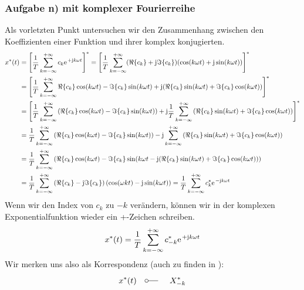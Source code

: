 \documentclass[11pt,a4paper,DIV=12]{scrartcl}
\begin{document}
\subsubsection{Aufgabe n) mit komplexer Fourierreihe}
%
Als vorletzten Punkt untersuchen wir den Zusammenhang zwischen den Koeffizienten
einer Funktion und ihrer komplex konjugierten.
%
%
\begin{align}
	x^*(t)&=\left [\frac{1}{T}\sum_{k=-\infty}^{+\infty}c_k\e^{+\im k \omega t}\right ]^*=\left [\frac{1}{T}\sum_{k=-\infty}^{+\infty}(\Re\{c_k\}+\im\Im\{c_k\})(\cos(k\omega t)+\im\sin(k\omega t))\right ]^*\nonumber \\
	&=\left [\frac{1}{T}\sum_{k=-\infty}^{+\infty}\Re\{c_k\}\cos(k\omega t)-\Im\{c_k\}\sin(k\omega t)+\im (\Re\{c_k\}\sin(k\omega t)+\Im\{c_k\}\cos(k\omega t)) \right ]^*\nonumber \\
	&=\left [\frac{1}{T}\sum_{k=-\infty}^{+\infty}\left (\Re\{c_k\}\cos(k\omega t)-\Im\{c_k\}\sin(k\omega t)\right )+\im\frac{1}{T}\sum_{k=-\infty}^{+\infty}\left (\Re\{c_k\}\sin(k\omega t)+\Im\{c_k\}\cos(k\omega t)\right )\right ]^*\nonumber \\
	&=\frac{1}{T}\sum_{k=-\infty}^{+\infty}\left (\Re\{c_k\}\cos(k\omega t)-\Im\{c_k\}\sin(k\omega t)\right )-\im\sum_{k=-\infty}^{+\infty}\left (\Re\{c_k\}\sin(k\omega t)+\Im\{c_k\}\cos(k\omega t)\right )\nonumber \\
	&=\frac{1}{T}\sum_{k=-\infty}^{+\infty}\left (\Re\{c_k\}\cos(k\omega t)-\Im\{c_k\}\sin(k\omega t-\im(\Re\{c_k\}\sin(k\omega t)+\Im\{c_k\}\cos(k\omega t))\right )\nonumber \\
	\label{eq:ComplexConjugatedFourierSeries}
	&=\frac{1}{T}\sum_{k=-\infty}^{+\infty}\left(\Re\{c_k\}-\im\Im\{c_k\}\right)\left(\cos(\omega k t)-\im\sin(k\omega t) \right)=\frac{1}{T}\sum_{k=-\infty}^{+\infty}c_k^*\e^{-\im k \omega t}
\end{align}
%
%
%
Wenn wir den Index von $c_k$ zu $-k$ verändern, können wir in der komplexen
Exponentialfunktion wieder ein +-Zeichen schreiben.
%
%
\begin{align}
	x^*(t)=\frac{1}{T}\sum_{k=-\infty}^{+\infty}c_{-k}^*\e^{+\im k \omega t}
\end{align}
%
%
Wir merken uns also als Korrespondenz (auch zu finden in \cite[Kap. 3, S. 208]{Oppenheim1997}):
%
\begin{align}
	x^*(t)\quad\fourier\quad X_{-k}^*
\end{align}
%
\newpage
\end{document}
